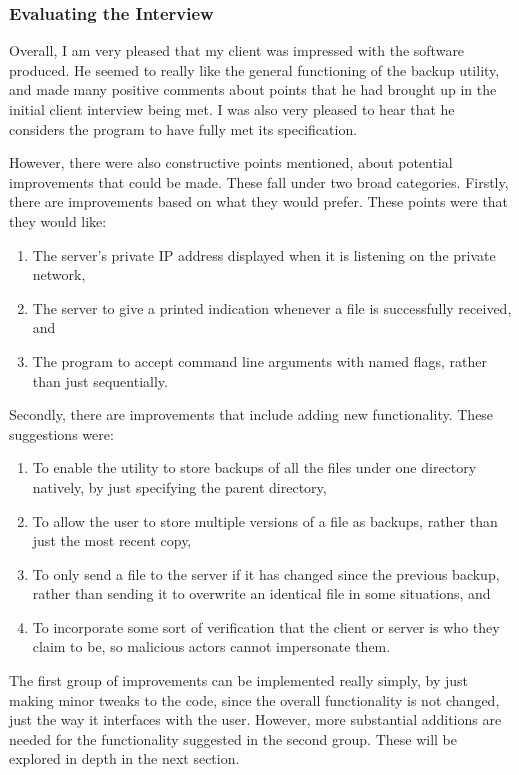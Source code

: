 \documentclass[../main.tex]{subfiles}
\begin{document}
\subsubsection{Evaluating the Interview}

Overall, I am very pleased that my client was impressed with the software produced. He seemed to really like the general functioning of the backup utility, and made many positive comments about points that he had brought up in the initial client interview being met. I was also very pleased to hear that he considers the program to have fully met its specification.

However, there were also constructive points mentioned, about potential improvements that could be made. These fall under two broad categories. Firstly, there are improvements based on what they would prefer. These points were that they would like:
\begin{enumerate}
    \item The server's private IP address displayed when it is listening on the private network,
    \item The server to give a printed indication whenever a file is successfully received, and
    \item The program to accept command line arguments with named flags, rather than just sequentially.
\end{enumerate}
Secondly, there are improvements that include adding new functionality. These suggestions were:
\begin{enumerate}
    \item To enable the utility to store backups of all the files under one directory natively, by just specifying the parent directory,
    \item To allow the user to store multiple versions of a file as backups, rather than just the most recent copy,
    \item To only send a file to the server if it has changed since the previous backup, rather than sending it to overwrite an identical file in some situations, and
    \item To incorporate some sort of verification that the client or server is who they claim to be, so malicious actors cannot impersonate them.
\end{enumerate}
The first group of improvements can be implemented really simply, by just making minor tweaks to the code, since the overall functionality is not changed, just the way it interfaces with the user. However, more substantial additions are needed for the functionality suggested in the second group. These will be explored in depth in the next section.
\end{document}
